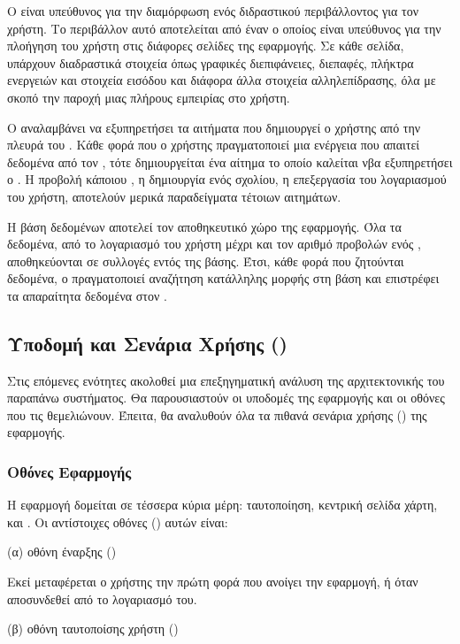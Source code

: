 Ο  είναι υπεύθυνος για την διαμόρφωση ενός διδραστικού περιβάλλοντος για τον χρήστη. Το περιβάλλον αυτό αποτελείται από έναν  ο οποίος είναι υπεύθυνος για την πλοήγηση του χρήστη στις διάφορες σελίδες της εφαρμογής. Σε κάθε σελίδα, υπάρχουν διαδραστικά στοιχεία όπως γραφικές διεπιφάνειες, διεπαφές, πλήκτρα ενεργειών και στοιχεία εισόδου και διάφορα άλλα στοιχεία αλληλεπίδρασης, όλα με σκοπό την παροχή μιας πλήρους εμπειρίας στο χρήστη.

Ο  αναλαμβάνει να εξυπηρετήσει τα αιτήματα που δημιουργεί ο χρήστης από την πλευρά του . Κάθε φορά που ο χρήστης πραγματοποιεί μια ενέργεια που απαιτεί δεδομένα από τον , τότε δημιουργείται ένα αίτημα το οποίο καλείται νβα εξυπηρετήσει ο . Η προβολή κάποιου , η δημιουργία ενός σχολίου, η επεξεργασία του λογαριασμού του χρήστη, αποτελούν μερικά παραδείγματα τέτοιων αιτημάτων.

Η βάση δεδομένων αποτελεί τον αποθηκευτικό χώρο της εφαρμογής. Όλα τα δεδομένα, από το λογαριασμό του χρήστη μέχρι και τον αριθμό προβολών ενός , αποθηκεύονται σε συλλογές εντός της βάσης. Έτσι, κάθε φορά που ζητούνται δεδομένα, ο  πραγματοποιεί αναζήτηση κατάλληλης μορφής στη βάση και επιστρέφει τα απαραίτητα δεδομένα στον .


\subsection{Υποδομή  και Σενάρια Χρήσης (\textit{})}
Στις επόμενες ενότητες ακολοθεί μια επεξηγηματική ανάλυση της αρχιτεκτονικής του παραπάνω συστήματος. Θα παρουσιαστούν οι υποδομές της εφαρμογής και οι οθόνες που τις θεμελιώνουν. Έπειτα, θα αναλυθούν όλα τα πιθανά σενάρια χρήσης () της εφαρμογής. 

\subsubsection{Οθόνες Εφαρμογής}
Η εφαρμογή δομείται σε τέσσερα κύρια μέρη: ταυτοποίηση, κεντρική σελίδα χάρτη,  και . Οι αντίστοιχες οθόνες () αυτών είναι:
\item (α) οθόνη έναρξης (\textit{})

Εκεί μεταφέρεται ο χρήστης την πρώτη φορά που ανοίγει την εφαρμογή, ή όταν αποσυνδεθεί από το λογαριασμό του.

\item (β) οθόνη ταυτοποίσης χρήστη (\textit{}) 

